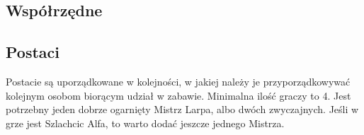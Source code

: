 	


	\subsection{Współrzędne}
	\label{sec:wspolrzedne}
		\begin{multicols}{3}
		\end{multicols}

	\subsection{Postaci}
	\label{sec:characters}
		Postacie są uporządkowane w kolejności, w jakiej należy je przyporządkowywać kolejnym osobom biorącym udział w zabawie.
		Minimalna ilość graczy to 4. Jest potrzebny jeden dobrze ogarnięty Mistrz Larpa, albo dwóch zwyczajnych.
		Jeśli w grze jest Szlachcic Alfa, to warto dodać jeszcze jednego Mistrza.
		
